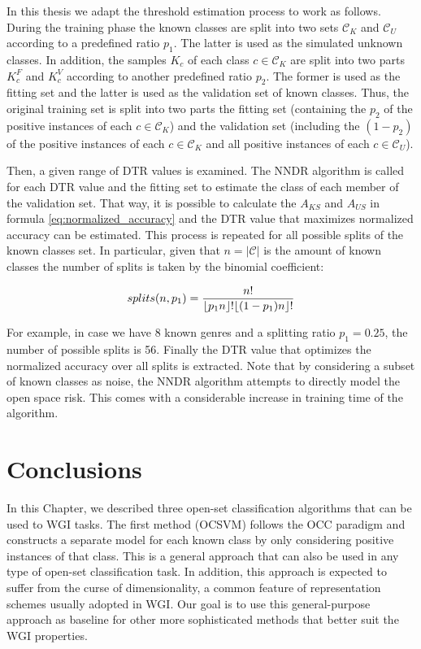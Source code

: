 In this thesis we adapt the threshold estimation process to work as follows. During the training phase the known classes are split into two sets $\mathcal{C}_K$ and $\mathcal{C}_{U}$ according to a predefined ratio $p_1$. The latter is used as the simulated unknown classes. In addition, the samples $K_c$ of each class $c \in \mathcal{C}_K$ are split into two parts $K_c^F$ and $K_c^V$ according to another predefined ratio $p_2$. The former is used as the fitting set and the latter is used as the validation set of known classes. Thus, the original training set is split into two parts the fitting set (containing the $p_2$ of the positive instances of each $c \in \mathcal{C}_K$) and the validation set (including the $(1-p_2)$ of the positive instances of each $c \in \mathcal{C}_K$ and all positive instances of each $c \in \mathcal{C}_U$). 

Then, a given range of DTR values is examined. The NNDR algorithm is called for each DTR value and the fitting set to estimate the class of each member of the validation set. That way, it is possible to calculate the $A_{KS}$ and $A_{US}$ in formula \ref{eq:normalized_accuracy} and the DTR value that maximizes normalized accuracy can be estimated. This process is repeated for all possible splits of the known classes set. In particular, given that $n = |\mathcal{C}|$ is the amount of known classes the number of splits is taken by the binomial coefficient:

\begin{equation} \label{eq:splt}
    splits(n,p_1) = \frac{n!}{\floor*{p_1n}!\floor*{(1-p_1)n}!}
\end{equation}

For example, in case we have 8 known genres and a splitting ratio $p_1=0.25$, the number of possible splits is 56. Finally the DTR value that optimizes the normalized accuracy over all splits is extracted. Note that by considering a subset of known classes as noise, the NNDR algorithm attempts to directly model the open space risk. This comes with a considerable increase in training time of the algorithm. 

\section{Conclusions}\label{chap:openset:sec:NNRD_Description}

In this Chapter, we described three open-set classification algorithms that can be used to WGI tasks. The first method (OCSVM) follows the OCC paradigm and constructs a separate model for each known class by only considering positive instances of that class. This is a general approach that can also be used in any type of open-set classification task. In addition, this approach is expected to suffer from the curse of dimensionality, a common feature of representation schemes usually adopted in WGI. Our goal is to use this general-purpose approach as baseline for other more sophisticated methods that better suit the WGI properties.

